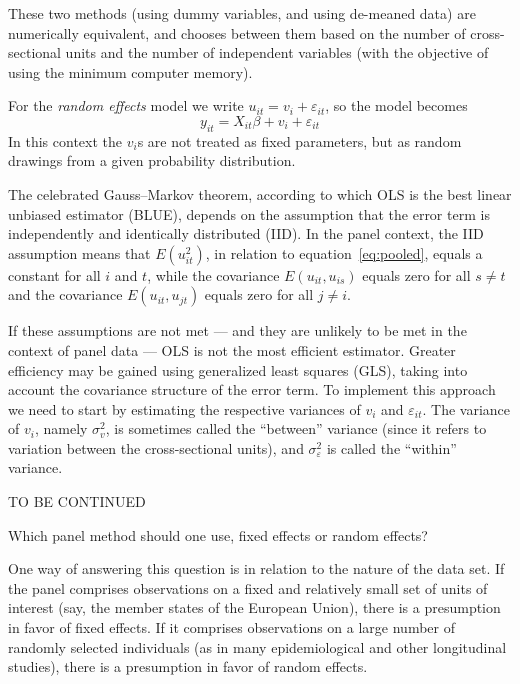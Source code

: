 These two methods (using dummy variables, and using de-meaned data) are
numerically equivalent, and  chooses between them based on
the number of cross-sectional units and the number of independent
variables (with the objective of using the minimum computer memory).

For the \textsl{random effects} model we write $u_{it} = v_i +
\varepsilon_{it}$, so the model becomes
\begin{equation}
\label{eq:RE}
y_{it} = X_{it}\beta + v_i + \varepsilon_{it}
\end{equation}
In this context the $v_i$s are not treated as fixed parameters, but as
random drawings from a given probability distribution.  

The celebrated Gauss--Markov theorem, according to which OLS is the
best linear unbiased estimator (BLUE), depends on the assumption that
the error term is independently and identically distributed (IID).  In
the panel context, the IID assumption means that $E(u_{it}^2)$, in
relation to equation~\ref{eq:pooled}, equals a constant for all $i$
and $t$, while the covariance $E(u_{it}, u_{is})$ equals zero for all
$s \neq t$ and the covariance $E(u_{it}, u_{jt})$ equals zero for all
$j \neq i$.

If these assumptions are not met --- and they are unlikely to be met
in the context of panel data --- OLS is not the most efficient
estimator.  Greater efficiency may be gained using generalized least
squares (GLS), taking into account the covariance structure of the
error term.  To implement this approach we need to start by estimating
the respective variances of $v_i$ and $\varepsilon_{it}$.  The
variance of $v_i$, namely $\sigma^2_v$, is sometimes called the
``between'' variance (since it refers to variation between the
cross-sectional units), and $\sigma^2_{\varepsilon}$ is called the
``within'' variance.

TO BE CONTINUED

Which panel method should one use, fixed effects or random effects?

One way of answering this question is in relation to the nature of the
data set.  If the panel comprises observations on a fixed and
relatively small set of units of interest (say, the member states of
the European Union), there is a presumption in favor of fixed effects.
If it comprises observations on a large number of randomly selected
individuals (as in many epidemiological and other longitudinal
studies), there is a presumption in favor of random effects.


